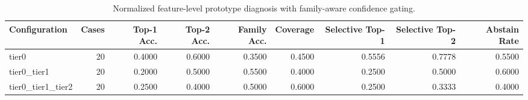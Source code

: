 \begin{table}[t]
\centering
\caption{Normalized feature-level prototype diagnosis with family-aware confidence gating.}
\label{tab:dice_stressor_hierarchical_diagnosis}
\footnotesize
\begin{tabular}{lrrrrrrrr}
\toprule
Configuration & Cases & Top-1 Acc. & Top-2 Acc. & Family Acc. & Coverage & Selective Top-1 & Selective Top-2 & Abstain Rate \\
\midrule
tier0 & 20 & 0.4000 & 0.6000 & 0.3500 & 0.4500 & 0.5556 & 0.7778 & 0.5500 \\
tier0_tier1 & 20 & 0.2000 & 0.5000 & 0.5500 & 0.4000 & 0.2500 & 0.5000 & 0.6000 \\
tier0_tier1_tier2 & 20 & 0.2500 & 0.4000 & 0.5000 & 0.6000 & 0.2500 & 0.3333 & 0.4000 \\
\bottomrule
\end{tabular}

\end{table}
